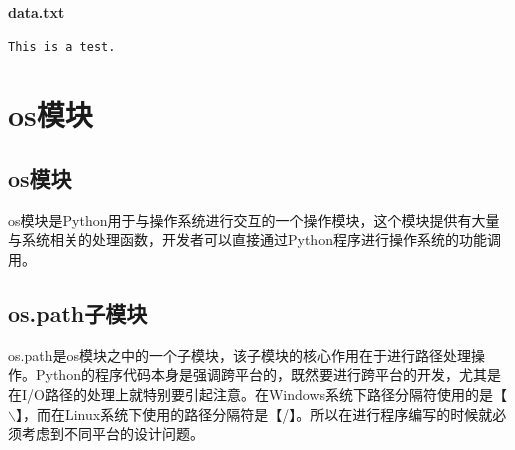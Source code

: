\begin{tcolorbox}
	\textbf{data.txt}
	\begin{verbatim}
This is a test.
\end{verbatim}
\end{tcolorbox}

\newpage

\section{os模块}

\subsection{os模块}

os模块是Python用于与操作系统进行交互的一个操作模块，这个模块提供有大量与系统相关的处理函数，开发者可以直接通过Python程序进行操作系统的功能调用。

\begin{table}[H]
	\centering
	\caption{os模块}
\end{table}

\vspace{0.5cm}

\subsection{os.path子模块}

os.path是os模块之中的一个子模块，该子模块的核心作用在于进行路径处理操作。Python的程序代码本身是强调跨平台的，既然要进行跨平台的开发，尤其是在I/O路径的处理上就特别要引起注意。在Windows系统下路径分隔符使用的是【$ \backslash $】，而在Linux系统下使用的路径分隔符是【/】。所以在进行程序编写的时候就必须考虑到不同平台的设计问题。\\

